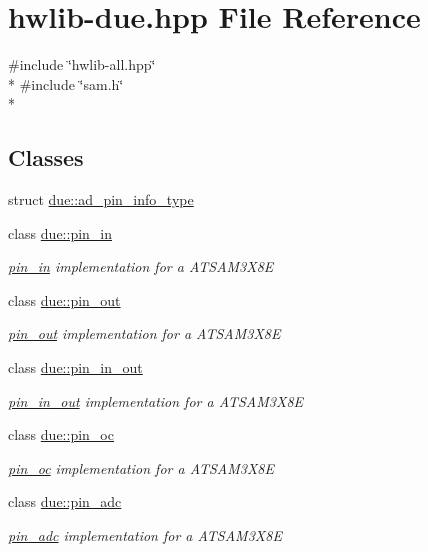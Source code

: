 \hypertarget{hwlib-due_8hpp}{}\section{hwlib-\/due.hpp File Reference}
\label{hwlib-due_8hpp}
{\ttfamily \#include \char`\"{}hwlib-\/all.\+hpp\char`\"{}}\\*
{\ttfamily \#include \char`\"{}sam.\+h\char`\"{}}\\*
\subsection*{Classes}
\begin{DoxyCompactItemize}
\item 
struct \hyperlink{structdue_1_1ad__pin__info__type}{due\+::ad\+\_\+pin\+\_\+info\+\_\+type}
\item 
class \hyperlink{classdue_1_1pin__in}{due\+::pin\+\_\+in}
\begin{DoxyCompactList}\small\item\em \hyperlink{classdue_1_1pin__in}{pin\+\_\+in} implementation for a A\+T\+S\+A\+M3\+X8E \end{DoxyCompactList}\item 
class \hyperlink{classdue_1_1pin__out}{due\+::pin\+\_\+out}
\begin{DoxyCompactList}\small\item\em \hyperlink{classdue_1_1pin__out}{pin\+\_\+out} implementation for a A\+T\+S\+A\+M3\+X8E \end{DoxyCompactList}\item 
class \hyperlink{classdue_1_1pin__in__out}{due\+::pin\+\_\+in\+\_\+out}
\begin{DoxyCompactList}\small\item\em \hyperlink{classdue_1_1pin__in__out}{pin\+\_\+in\+\_\+out} implementation for a A\+T\+S\+A\+M3\+X8E \end{DoxyCompactList}\item 
class \hyperlink{classdue_1_1pin__oc}{due\+::pin\+\_\+oc}
\begin{DoxyCompactList}\small\item\em \hyperlink{classdue_1_1pin__oc}{pin\+\_\+oc} implementation for a A\+T\+S\+A\+M3\+X8E \end{DoxyCompactList}\item 
class \hyperlink{classdue_1_1pin__adc}{due\+::pin\+\_\+adc}
\begin{DoxyCompactList}\small\item\em \hyperlink{classdue_1_1pin__adc}{pin\+\_\+adc} implementation for a A\+T\+S\+A\+M3\+X8E \end{DoxyCompactList}\end{DoxyCompactItemize}
